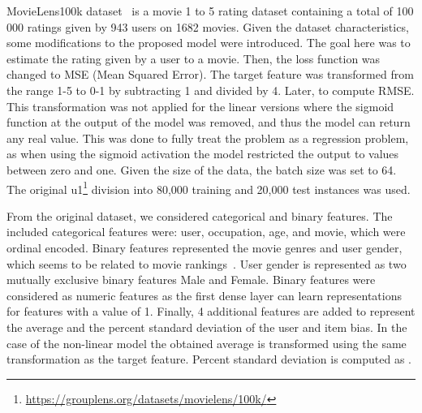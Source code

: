 \documentclass[manuscript,nonacm]{acmart}
\begin{document}
MovieLens100k dataset~\cite{movielens} is a movie 1 to 5 rating dataset containing a total of 100\,000 ratings given by 943 users on 1682 movies. Given the dataset characteristics, some modifications to the proposed model were introduced. The goal here was to estimate the rating given by a user to a movie. Then, the loss function was changed to MSE (Mean Squared Error). The target feature was transformed from the range 1-5 to 0-1 by subtracting 1 and divided by 4. Later, to compute RMSE. This transformation was not applied for the linear versions where the sigmoid function at the output of the model was removed, and thus the model can return any real value. This was done to fully treat the problem as a regression problem, as when using the sigmoid activation the model restricted the output to values between zero and one. Given the size of the data, the batch size was set to 64. The original u1\footnote{\url{https://grouplens.org/datasets/movielens/100k/}} division into 80,000 training and 20,000 test instances was used.

From the original dataset, we considered categorical and binary features. The included categorical features were: user, occupation, age, and movie, which were ordinal encoded. Binary features represented the movie genres and user gender, which seems to be related to movie rankings~\cite{gender_ml}. User gender is represented as two mutually exclusive binary features Male and Female. Binary features were considered as numeric features as the first dense layer can learn representations for features with a value of 1. Finally, 4 additional features are added to represent the average and the percent standard deviation of the user and item bias. In the case of the non-linear model the obtained average is transformed using the same transformation as the target feature. Percent standard deviation is computed as .

\begin{table}
    \centering
    \caption{Results obtained for the evaluated models for the MovieLens100k dataset}
    \label{tab:results-movie100k}\vspace{-1.0cm}
\end{table}
\end{document}
